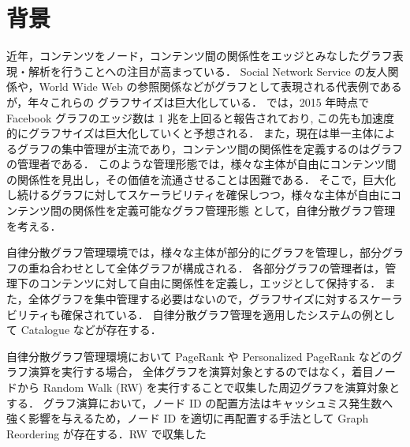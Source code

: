 \section{背景}
近年，コンテンツをノード，コンテンツ間の関係性をエッジとみなしたグラフ表現・解析を行うことへの注目が高まっている．
Social Network Service の友人関係や，World Wide Web の参照関係などがグラフとして表現される代表例であるが，年々これらの
グラフサイズは巨大化している．
\cite{ching2015one}では，2015 年時点で Facebook グラフのエッジ数は 1 兆を上回ると報告されており, 
この先も加速度的にグラフサイズは巨大化していくと予想される．
また，現在は単一主体によるグラフの集中管理が主流であり，コンテンツ間の関係性を定義するのはグラフの管理者である．
このような管理形態では，様々な主体が自由にコンテンツ間の関係性を見出し，その価値を流通させることは困難である．
そこで，巨大化し続けるグラフに対してスケーラビリティを確保しつつ，様々な主体が自由にコンテンツ間の関係性を定義可能なグラフ管理形態
として，自律分散グラフ管理を考える．

自律分散グラフ管理環境では，様々な主体が部分的にグラフを管理し，部分グラフの重ね合わせとして全体グラフが構成される．
各部分グラフの管理者は，管理下のコンテンツに対して自由に関係性を定義し，エッジとして保持する．
また，全体グラフを集中管理する必要はないので，グラフサイズに対するスケーラビリティも確保されている．
自律分散グラフ管理を適用したシステムの例として Catalogue \cite{catalogue}などが存在する．

自律分散グラフ管理環境において PageRank \cite{page1999pagerank} や Personalized PageRank \cite{page1999pagerank} などのグラフ演算を実行する場合，
全体グラフを演算対象とするのではなく，着目ノードから Random Walk (RW) を実行することで収集した周辺グラフを演算対象とする． 
グラフ演算において，ノード ID の配置方法はキャッシュミス発生数へ強く影響を与えるため，ノード ID を適切に再配置する手法として 
Graph Reordering が存在する．RW で収集した